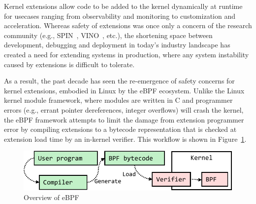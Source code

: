 



Kernel extensions allow code to be added to the kernel dynamically at
runtime for usecases ranging from observability and monitoring to
customization and acceleration.  Whereas safety of extensions was once
only a concern of the research community (e.g., SPIN~\cite{spin},
VINO~\cite{vino}, etc.), the shortening space between development,
debugging and deployment in today's industry landscape has created a
need for extending systems in production, where any system instability
caused by extensions is difficult to tolerate.

As a result, the past decade has seen the re-emergence of safety
concerns for kernel extensions, embodied in Linux by the eBPF
ecosystem.  Unlike the Linux kernel module framework, where modules
are written in C and programmer errors (e.g., errant pointer
dereferences, integer overflows) will crash the kernel, the eBPF
framework attempts to limit the damage from extension programmer error
by compiling extensions to a bytecode representation that is checked
at extension load time by an in-kernel verifier.  This workflow is
shown in Figure~\ref{fig:ebpf}.

\begin{figure}
    \includegraphics[width=1.0\linewidth]{figs/bpf_intro.pdf}
    \centering
    \vspace{-10pt}
    \caption{Overview of eBPF}
    \label{fig:ebpf}
    \vspace{-10pt}
\end{figure}

